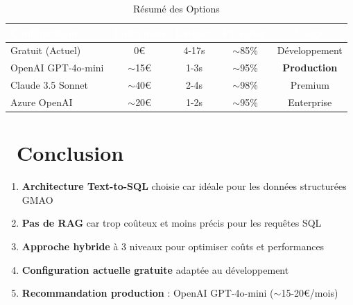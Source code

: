 \documentclass[12pt,a4paper]{article}
\begin{document}
\begin{table}[H]
\centering
{}
\begin{tabular}{|l|c|c|c|c|}
\hline
\rowcolor{primaryblue}
\textcolor{white}{\textbf{Configuration}} & \textcolor{white}{\textbf{Coût/mois}} & \textcolor{white}{\textbf{Latence}} & \textcolor{white}{\textbf{Précision}} & \textcolor{white}{\textbf{Usage}} \\
\hline
Gratuit (Actuel) & 0€ & 4-17s & $\sim$85\% & Développement \\
\rowcolor{successbox!20}
OpenAI GPT-4o-mini & $\sim$15€ & 1-3s & $\sim$95\% & \textbf{Production} \\
Claude 3.5 Sonnet & $\sim$40€ & 2-4s & $\sim$98\% & Premium \\
Azure OpenAI & $\sim$20€ & 1-2s & $\sim$95\% & Enterprise \\
\hline
\end{tabular}
\caption{Résumé des Options}
\end{table}

\section{\faFlagCheckered\ Conclusion}

\begin{tcolorbox}[
    enhanced,
    colback=primaryblue!10,
    colframe=primaryblue,
    title={\faStar\ Points Clés à Retenir},
    fonttitle=\bfseries
]
\begin{enumerate}
    \item \textbf{Architecture Text-to-SQL} choisie car idéale pour les données structurées GMAO
    \item \textbf{Pas de RAG} car trop coûteux et moins précis pour les requêtes SQL
    \item \textbf{Approche hybride} à 3 niveaux pour optimiser coûts et performances
    \item \textbf{Configuration actuelle gratuite} adaptée au développement
    \item \textbf{Recommandation production} : OpenAI GPT-4o-mini ($\sim$15-20€/mois)
\end{enumerate}
\end{tcolorbox}

\vspace{1cm}

\begin{center}
\end{center}

\end{document}

